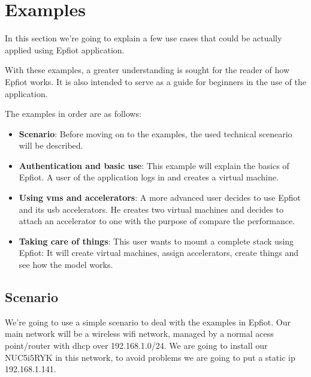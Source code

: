
\cleardoublepage


\chapter{Examples}
\label{makereference6}

In this section we're going to explain a few use cases that could be actually applied using Epfiot application.

With these examples, a greater understanding is sought for the reader of how Epfiot works. It is also intended to serve as a guide for beginners in the use of the application.


The examples in order are as follows:
\begin{itemize}
    \item \textbf{Scenario}: Before moving on to the examples, the used technical sceneario will be described.
    \item \textbf{Authentication and basic use}: This example will explain the basics of Epfiot. A user of the application logs in and creates a virtual machine.
    \item \textbf{Using vms and accelerators}: A more advanced user decides to use Epfiot and its usb accelerators. He creates two virtual machines and decides to attach an accelerator to one with the purpose of compare the performance.
    \item \textbf{Taking care of things}: This user wants to mount a complete stack using Epfiot: It will create virtual machines, assign accelerators, create things and see how the model works.
\end{itemize}

\newpage
\section{Scenario}
\label{makereference6.1}

We're going to use a simple scenario to deal with the examples in Epfiot.
Our main network will be a wireless wifi network, managed by a normal acess point/router with dhcp over 192.168.1.0/24. We are going to install our NUC5i5RYK in this network, to avoid problems we are going to put a static ip 192.168.1.141.

